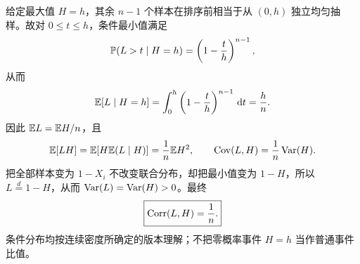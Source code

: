 给定最大值 $H=h$，其余 $n-1$ 个样本在排序前相当于从 $(0,h)$ 独立均匀抽样。故对 $0\le t\le h$，条件最小值满足
\[
\mathbb{P}(L>t\mid H=h)=\left(1-\frac th\right)^{n-1},
\]
从而
\[
\mathbb{E}[L\mid H=h]=\int_0^h\left(1-\frac th\right)^{n-1}\,\mathrm{d} t
=\frac hn.
\]
因此 $\mathbb{E} L=\mathbb{E} H/n$，且
\[
\mathbb{E}[LH]=\mathbb{E}\!\left[H\mathbb{E}(L\mid H)\right]=\frac1n\mathbb{E} H^2,
\qquad \operatorname{Cov}(L,H)=\frac1n\operatorname{Var}(H).
\]
把全部样本变为 $1-X_i$ 不改变联合分布，却把最小值变为 $1-H$，所以 $L\overset d=1-H$，从而 $\operatorname{Var}(L)=\operatorname{Var}(H)>0$。最终
\[
\boxed{\operatorname{Corr}(L,H)=\frac1n.}
\]
条件分布均按连续密度所确定的版本理解；不把零概率事件 $H=h$ 当作普通事件比值。
